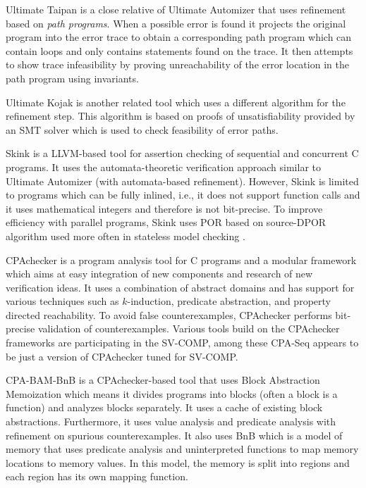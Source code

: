 Ultimate Taipan  is a close relative of Ultimate Automizer that uses refinement based on \emph{path programs}.
When a possible error is found it projects the original program into the error trace to obtain a corresponding path program which can contain loops and only contains statements found on the trace.
It then attempts to show trace infeasibility by proving unreachability of the error location in the path program using invariants.

Ultimate Kojak  is another related tool which uses a different algorithm for the refinement step.
This algorithm is based on proofs of unsatisfiability provided by an SMT solver which is used to check feasibility of error paths.

Skink  is a LLVM-based tool for assertion checking of sequential and concurrent C programs.
It uses the automata-theoretic verification approach similar to Ultimate Automizer (with automata-based refinement).
However, Skink is limited to programs which can be fully inlined, i.e., it does not support function calls and it uses mathematical integers and therefore is not bit-precise.
To improve efficiency with parallel programs, Skink uses POR based on source-DPOR algorithm used more often in stateless model checking .

CPAchecker  is a program analysis tool for C programs and a modular framework which aims at easy integration of new components and research of new verification ideas.
It uses a combination of abstract domains and has support for various techniques such as $k$-induction, predicate abstraction, and property directed reachability.
To avoid false counterexamples, CPAchecker performs bit-precise validation of counterexamples.
Various tools build on the CPAchecker frameworks are participating in the SV-COMP, among these CPA-Seq appears to be just a version of CPAchecker tuned for SV-COMP.

CPA-BAM-BnB  is a CPAchecker-based tool that uses Block Abstraction Memoization which means it divides programs into blocks (often a block is a function) and analyzes blocks separately.
It uses a cache of existing block abstractions.
Furthermore, it uses value analysis and predicate analysis with refinement on spurious counterexamples.
It also uses BnB which is a model of memory that uses predicate analysis and uninterpreted functions to map memory locations to memory values.
In this model, the memory is split into regions and each region has its own mapping function.

